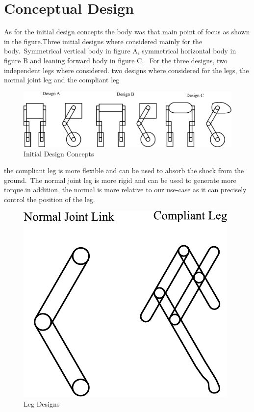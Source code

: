 \section{Conceptual Design}
As for the initial design concepts the body was that main point of focus as shown in the figure.Three initial designs where considered mainly for the body.\ Symmetrical vertical body in figure A, symmetrical horizontal body in figure B and leaning forward body in figure C.
\ For the three designs, two independent legs where considered.
two designs where considered for the legs, the normal joint leg and the compliant leg
\begin{figure}[h]
	\centering
	\includegraphics[width=1\linewidth]{Conceptual Design}
	\caption{Initial Design Concepts}
	\label{fig:initialdesigns}
\end{figure}

the compliant leg is more flexible and can be used to absorb the shock from the ground.\ The normal joint leg is more rigid and can be used to generate more torque.in addition, the normal is more relative to our use-case as it can precisely control the position of the leg.
\begin{figure}[h]
	\centering
	\includegraphics[width=0.4\linewidth]{Leg Design}
	\caption{Leg Designs}
	\label{fig:legdesigns}
\end{figure}





